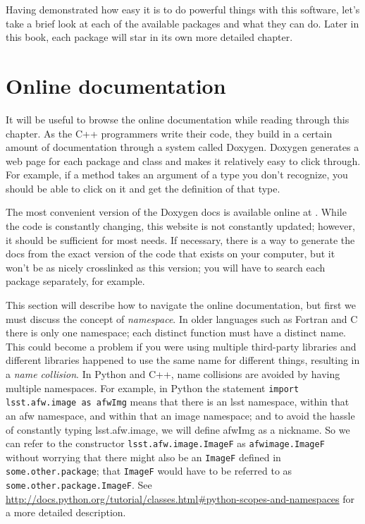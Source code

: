 
Having demonstrated how easy it is to do powerful things with this
software, let's take a brief look at each of the available packages
and what they can do.  Later in this book, each package will star in
its own more detailed chapter.

\section{Online documentation}

It will be useful to browse the online documentation while reading
through this chapter.  As the C++ programmers write their code, they
build in a certain amount of documentation through a system called
Doxygen.  Doxygen generates a web page for each package and class and
makes it relatively easy to click through.  For example, if a method
takes an argument of a type you don't recognize, you should be able to
click on it and get the definition of that type.

The most convenient version of the Doxygen docs is available online at .
While the code is constantly changing, this website is not constantly
updated; however, it should be sufficient for most needs.  If necessary,
there is a way to generate the docs from the exact version of the code that
exists on your computer, but it won't be as nicely crosslinked as this
version; you will have to search each package separately, for example.

This section will describe how to navigate the online documentation,
but first we must discuss the concept of {\it namespace}.  In older
languages such as Fortran and C there is only one namespace; each
distinct function must have a distinct name.  This could become a
problem if you were using multiple third-party libraries and different
libraries happened to use the same name for different things,
resulting in a {\it name collision}.  In Python and C++, name
collisions are avoided by having multiple namespaces.  For example, in
Python the statement \texttt{import lsst.afw.image as afwImg} means
that there is an lsst namespace, within that an afw namespace, and
within that an image namespace; and to avoid the hassle of constantly
typing lsst.afw.image, we will define afwImg as a nickname.  So we can
refer to the constructor \texttt{lsst.afw.image.ImageF} as \texttt{afwimage.ImageF}
without worrying that there might also be an \texttt{ImageF} defined
in \texttt{some.other.package}; that \texttt{ImageF} would have to be
referred to as \texttt{some.other.package.ImageF}.  See
\url{http://docs.python.org/tutorial/classes.html#python-scopes-and-namespaces}
for a more detailed description.


